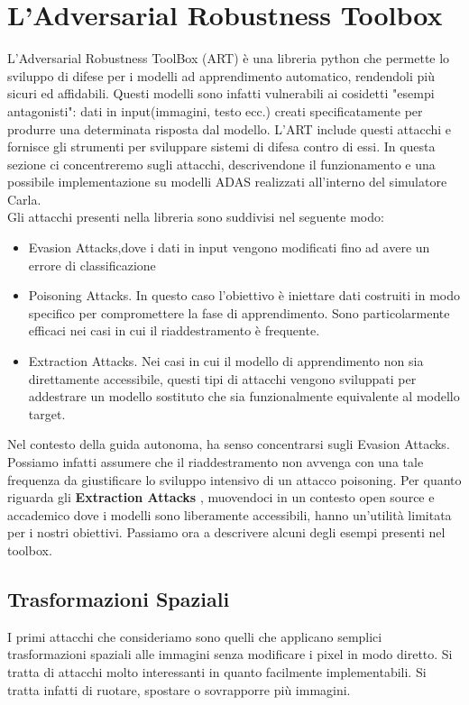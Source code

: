 \chapter{L'Adversarial Robustness Toolbox}
L'Adversarial Robustness ToolBox (ART)  è una libreria python che permette  lo  sviluppo di difese per i modelli ad apprendimento automatico, rendendoli più sicuri ed affidabili. Questi modelli sono infatti vulnerabili ai cosidetti "esempi antagonisti": dati in input(immagini, testo ecc.) creati specificatamente per produrre una determinata risposta dal modello. L'ART include questi attacchi e fornisce gli strumenti per sviluppare sistemi di difesa contro di essi. In questa sezione ci concentreremo sugli attacchi, descrivendone il funzionamento e una possibile implementazione su modelli ADAS realizzati all'interno del simulatore Carla.
\\

\noindent Gli attacchi presenti nella libreria sono suddivisi nel seguente modo:
\begin{itemize}
\item Evasion Attacks,dove i dati in input vengono modificati fino ad avere un errore di classificazione

\item Poisoning Attacks. In questo caso l'obiettivo è iniettare  dati  costruiti in modo specifico per compromettere la fase di apprendimento. 
Sono particolarmente efficaci nei casi in cui il riaddestramento è frequente.

\item Extraction Attacks. Nei casi in cui il modello di apprendimento non sia direttamente accessibile, questi tipi di attacchi vengono sviluppati per addestrare un modello sostituto che sia funzionalmente equivalente al modello target.
\end{itemize}

\noindent Nel contesto della guida autonoma, ha senso concentrarsi sugli Evasion Attacks.	 Possiamo infatti assumere che il riaddestramento non avvenga con una tale frequenza da giustificare lo sviluppo intensivo di un attacco poisoning.  Per quanto riguarda gli \textbf{Extraction Attacks} 
, muovendoci in un contesto open source e accademico dove i modelli sono liberamente accessibili, hanno un'utilità limitata per i nostri obiettivi.
Passiamo ora a descrivere alcuni degli esempi presenti nel toolbox.

\section{Trasformazioni Spaziali}
I primi attacchi che consideriamo sono quelli che applicano semplici trasformazioni spaziali alle immagini senza modificare i pixel in modo diretto. Si tratta di attacchi molto interessanti in quanto facilmente implementabili. Si tratta infatti  di ruotare, spostare o sovrapporre più immagini.

